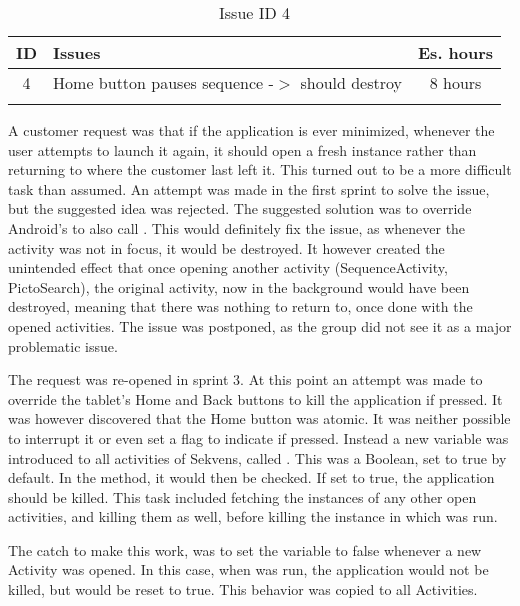 \begin{longtable} { | c | p{12cm} | c | } 
\hline
	ID 	&	Issues	&		 Es. hours \\\hline
	4 	&	Home button pauses sequence -$>$ should destroy	&	8 hours \\\hline
\caption{Issue ID 4}
\label{tab:spr3_homebuttonshoulddestroy}
\end{longtable}

A customer request was that if the application is ever minimized, whenever the user attempts to launch it again, it should open a fresh instance rather than returning to where the customer last left it. This turned out to be a more difficult task than assumed. An attempt was made in the first sprint to solve the issue, but the suggested idea was rejected. The suggested solution was to override Android's  to also call . This would definitely fix the issue, as whenever the activity was not in focus, it would be destroyed. It however created the unintended effect that once opening another activity (SequenceActivity, PictoSearch), the original activity, now in the background would have been destroyed, meaning that there was nothing to return to, once done with the opened activities. The issue was postponed, as the group did not see it as a major problematic issue.

The request was re-opened in sprint 3. At this point an attempt was made to override the tablet's Home and Back buttons to kill the application if pressed. It was however discovered that the Home button was atomic. It was neither possible to interrupt it or even set a flag to indicate if pressed. Instead a new variable was introduced to all activities of Sekvens, called . This was a Boolean, set to true by default. In the  method, it would then be checked. If set to true, the application should be killed. This task included fetching the instances of any other open activities, and killing them as well, before killing the instance in which  was run.

The catch to make this work, was to set the variable to false whenever a new Activity was opened. In this case, when  was run, the application would not be killed, but  would be reset to true. This behavior was copied to all Activities.